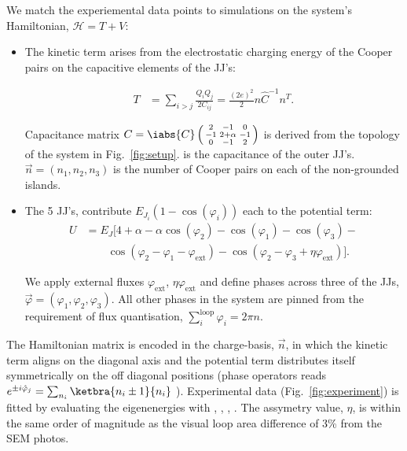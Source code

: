 \noindent We match the experiemental data points to simulations on the system's Hamiltonian, $ \mathcal{H} = T + V $:
\begin{itemize}
	
	\item The kinetic term arises from the electrostatic charging energy of the Cooper pairs on the capacitive elements of the JJ's:
	
	\begin{equation}\label{key}
	\begin{aligned}
	T & = \sum_{i>j}\frac{Q_iQ_j}{2C_{ij}} = \frac{(2e)^2}{2}n\hat{C}^{-1}n^{T}.
	\end{aligned}
	\end{equation}
	
	\noindent Capacitance matrix $ C=\iabs{C}\left(\begin{smallmatrix} 2 & -1 & 0\\ -1 & 2 + \alpha & -1\\ 0 & -1 & 2	\end{smallmatrix}\right)$ is derived from the topology of the system in Fig.~\ref{fig:setup}.  is the capacitance of the outer JJ's. $ \vec{n} = (n_1, n_2, n_3) $ is the number of Cooper pairs on each of the non-grounded islands.
	
	\item The 5 JJ's, contribute $ E_{J_i}(1-\cos(\varphi_i)) $ each to the potential term:
	\begin{equation}\label{key}
	\begin{aligned}
	U & = E_J\big[4 + \alpha - \alpha\cos(\varphi_{2}) -\cos(\varphi_{1}) -\cos(\varphi_{3}) - \\ & \qquad \cos(\varphi_{2} - \varphi_{1} - \varphi_{\text{ext}}) - \cos(\varphi_{2} - \varphi_{3} + \eta\varphi_{\text{ext}})\big].
	\end{aligned}	
	\end{equation}
	
	\noindent  We apply external fluxes $ \varphi_\text{ext} $, $ \eta\varphi_\text{ext} $ and define phases across three of the JJs, $ \vec{\varphi} = (\varphi_1, \varphi_2, \varphi_3) $. All other phases in the system are pinned from the requirement of flux quantisation, $ \sum_i^{\text{loop}} \varphi_i = 2\pi n $.
\end{itemize}

 \noindent The Hamiltonian matrix is encoded in the charge-basis, $\vec{n} $, in which the kinetic term aligns on the diagonal axis and the potential term distributes itself symmetrically on the off diagonal positions (phase operators reads $ e^{\pm i\hat{\varphi}_j} = \sum_{n_i}\ketbra{n_i\pm1}{n_i}$ \cite{phase}). Experimental data (Fig.~\ref{fig:experiment}) is fitted by evaluating the eigenenergies with , , , . The assymetry value, $ \eta $, is within the same order of magnitude as the visual loop area difference of 3\% from the SEM photos.
 
